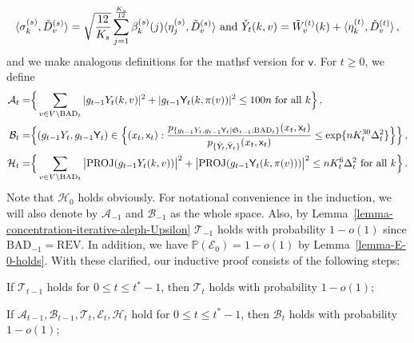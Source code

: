 \documentclass[11pt]{article}
\def\P{\mathbb{P}}
\numberwithin{equation}{section}
\begin{document}
\begin{align*}
    \langle \sigma^{(s)}_k, \Check{D}^{(s)}_v \rangle = \sqrt{\frac{12}{K_s}} \sum_{j=1}^{ \frac{K_s}{12} } \beta^{(s)}_k (j) \langle \eta^{(s)}_j, \Check{D}^{(s)}_v \rangle  \mbox{ and }
    \Check{Y}_t(k,v) = \Tilde{W}^{(t)}_v(k) + \langle \eta^{(t)}_k, \Check{D}^{(t)}_v \rangle\,,
\end{align*}
and we make analogous definitions for the mathsf version for $\mathsf v$. For $t\geq 0$, we define
\begin{align*}
    \mathcal{A}_t =& \Big\{  \sum_{v \in V \setminus \mathrm{BAD}_t}  |g_{t-1} Y_t (k,v)|^2 + |g_{t-1} \mathsf{Y}_t (k,\pi(v))|^2  \leq 100 n \mbox{ for all } k \Big\} \,,  \\
    \mathcal{B}_t =& \Big\{ ( g_{t-1} Y_t , g_{t-1} \mathsf{Y}_t ) \in \Big\{ (x_{t}, \mathsf{x}_t): \frac{ p_{ \{ g_{t-1} Y_t , g_{t-1} \mathsf{Y}_t | \mathfrak{S}_{t-1}; \mathrm{BAD}_t \}} (x_{t}, \mathsf{x}_t) }{ p_{\{  \Check{Y}_t , \Check{\mathsf{Y}}_t  \}} (x_{t}, \mathsf{x}_t) } \leq \exp \{ n K_t^{30} \Delta_t^2 \} \Big\} \Big\}\,, \\
    \mathcal{H}_t =& \Big\{ \sum_{v \in V \setminus \mathrm{BAD}_t } \big| \textup{PROJ}(g_{t-1} Y_t(k,v) ) \big|^2+ \big| \textup{PROJ}( g_{t-1} \mathsf{Y}_t (k,\pi(v)) ) \big|^2  \leq n K_t^{6} \Delta^2_t \mbox{ for all } k \Big\} \,.
\end{align*}
Note that $\mathcal{H}_0$ holds obviously. For notational convenience in the induction, we will also denote by $\mathcal A_{-1}$ and $\mathcal B_{-1}$ as the whole space. Also, by Lemma~\ref{lemma-concentration-iterative-aleph-Upsilon} $\mathcal{T}_{-1}$ holds with probability $1-o(1)$ since $\mathrm{BAD}_{-1} = \mathrm{REV}$. In addition, we have $\P(\mathcal{E}_0) = 1-o(1)$ by Lemma~\ref{lemma-E-0-holds}. With these clarified, our inductive proof consists of the following steps:


 If $\mathcal{T}_{t-1}$ holds for $0 \leq t \leq t^{*}-1$, then $\mathcal{T}_{t}$ holds with probability $1-o(1)$;

 If $\mathcal{A}_{t-1}, \mathcal{B}_{t-1}, \mathcal{T}_{t}, \mathcal{E}_{t}, \mathcal{H}_{t}$ hold for $0 \leq t \leq t^{*}-1$, then $\mathcal{B}_{t}$ holds with probability $1-o(1)$;
\end{document}
